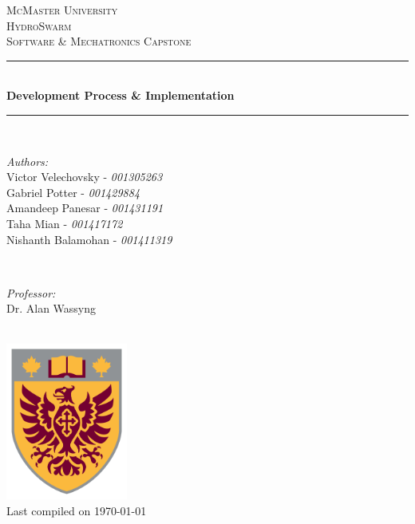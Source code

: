 \documentclass[11pt]{article}
\begin{document}
\begin{titlepage}
	\newcommand{\HRule}{\rule{\linewidth}{0.2mm}}
	\begin{center}
	\textsc{\LARGE McMaster University}\\[1.5cm]
	
	\textsc{\Large HydroSwarm}\\[0.5cm]
	\textsc{\large Software \& Mechatronics Capstone}\\[0.5cm] 

	\HRule\\[0.4cm]
		{\huge\bfseries Development Process \& Implementation}\\[0.4cm]
	\HRule\\[0.4cm]
	
	\begin{minipage}[t][][t]{0.5\textwidth}
		\begin{flushleft} \large
			\emph{Authors:}\\
			Victor Velechovsky - \textit{001305263}\\
			Gabriel Potter - \textit{001429884}\\
			Amandeep Panesar - \textit{001431191} \\
			Taha Mian  - \textit{001417172}\\
			Nishanth Balamohan - \textit{001411319} \\
		\end{flushleft}
	\end{minipage}
	~
	\begin{minipage}[t][][t]{0.4\textwidth}
		\begin{flushright} \large
			\emph{Professor:} \\
			Dr. Alan Wassyng \\[0.4cm]
		\end{flushright}
	\end{minipage}\\[2cm]
	
	\includegraphics[width=0.3\textwidth]{logo.png} \\
	{\large Last compiled on \today}
	\end{center}

\end{titlepage}
\end{document}
